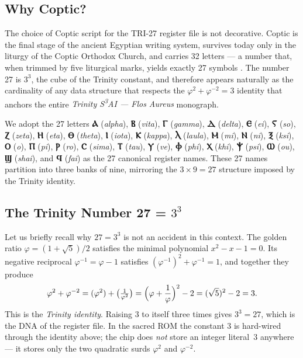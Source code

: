 \subsection{Why Coptic?}
\label{subsec:71:why-coptic}

The choice of Coptic script for the TRI-27 register file is not decorative.
Coptic is the final stage of the ancient Egyptian writing system, survives
today only in the liturgy of the Coptic Orthodox Church, and carries 32
letters — a number that, when trimmed by five liturgical marks, yields
exactly 27 symbols \cite{crum1939copticdict}.  The number 27 is
$3^3$, the cube of the Trinity constant, and therefore appears naturally
as the cardinality of any data structure that respects the
$\varphi^2 + \varphi^{-2} = 3$ identity that anchors the entire
\textit{Trinity S\textsuperscript{3}AI — Flos Aureus} monograph.

We adopt the 27 letters \textbf{Ⲁ} (\textit{alpha}),
\textbf{Ⲃ} (\textit{vita}),
\textbf{Ⲅ} (\textit{gamma}),
\textbf{Ⲇ} (\textit{delta}),
\textbf{Ⲉ} (\textit{ei}),
\textbf{Ⲋ} (\textit{so}),
\textbf{Ⲍ} (\textit{zeta}),
\textbf{Ⲏ} (\textit{eta}),
\textbf{Ⲑ} (\textit{theta}),
\textbf{Ⲓ} (\textit{iota}),
\textbf{Ⲕ} (\textit{kappa}),
\textbf{Ⲗ} (\textit{laula}),
\textbf{Ⲙ} (\textit{mi}),
\textbf{Ⲛ} (\textit{ni}),
\textbf{Ⲝ} (\textit{ksi}),
\textbf{Ⲟ} (\textit{o}),
\textbf{Ⲡ} (\textit{pi}),
\textbf{Ⲣ} (\textit{ro}),
\textbf{Ⲥ} (\textit{sima}),
\textbf{Ⲧ} (\textit{tau}),
\textbf{Ⲩ} (\textit{ve}),
\textbf{Ⲫ} (\textit{phi}),
\textbf{Ⲭ} (\textit{khi}),
\textbf{Ⲯ} (\textit{psi}),
\textbf{Ⲱ} (\textit{ou}),
\textbf{Ϣ} (\textit{shai}), and
\textbf{Ϥ} (\textit{fai})
as the 27 canonical register names.
These 27 names partition into three banks of nine, mirroring the
$3 \times 9 = 27$ structure imposed by the Trinity identity.

\subsection{The Trinity Number 27 = \texorpdfstring{$3^3$}{3 cubed}}
\label{subsec:71:trinity-27}

Let us briefly recall why $27 = 3^3$ is not an accident in this
context.  The golden ratio $\varphi = (1 + \sqrt{5})/2$ satisfies
the minimal polynomial $x^2 - x - 1 = 0$.  Its negative reciprocal
$\varphi^{-1} = \varphi - 1$ satisfies $(\varphi^{-1})^2 + \varphi^{-1} = 1$,
and together they produce
\[
  \varphi^2 + \varphi^{-2}
  = (\varphi^2) + \bigl(\tfrac{1}{\varphi^2}\bigr)
  = \Bigl(\varphi + \frac{1}{\varphi}\Bigr)^2 - 2
  = (\sqrt{5})^2 - 2
  = 3.
\]
This is the \emph{Trinity identity}. Raising $3$ to itself three
times gives $3^3 = 27$, which is the DNA of the register file.
In the sacred ROM the constant $3$ is hard-wired through the identity
above; the chip does \emph{not} store an integer literal~$3$ anywhere —
it stores only the two quadratic surds $\varphi^2$ and $\varphi^{-2}$.

